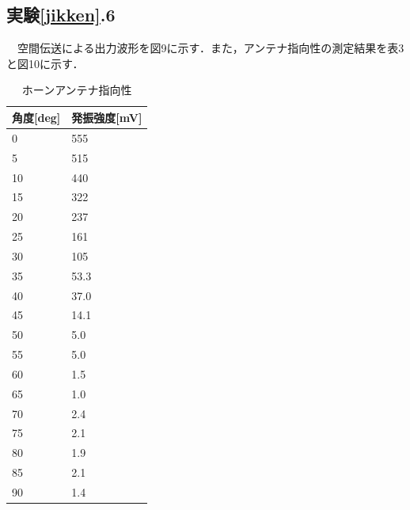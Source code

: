   \subsection{実験\ref{jikken}.6}
  　空間伝送による出力波形を図9に示す．また，アンテナ指向性の測定結果を表3と図10に示す．
  \begin{table}[H]
    \centering
    \caption{ホーンアンテナ指向性}
    \begin{tabular}{|l|l|}
    \hline
    角度{[}deg{]} & 発振強度{[}mV{]} \\ \hline
    0           & 555          \\ \hline
    5           & 515          \\ \hline
    10          & 440          \\ \hline
    15          & 322          \\ \hline
    20          & 237          \\ \hline
    25          & 161          \\ \hline
    30          & 105          \\ \hline
    35          & 53.3         \\ \hline
    40          & 37.0         \\ \hline
    45          & 14.1         \\ \hline
    50          & 5.0          \\ \hline
    55          & 5.0          \\ \hline
    60          & 1.5          \\ \hline
    65          & 1.0          \\ \hline
    70          & 2.4          \\ \hline
    75          & 2.1          \\ \hline
    80          & 1.9          \\ \hline
    85          & 2.1          \\ \hline
    90          & 1.4          \\ \hline
    \end{tabular}
  \end{table}

  
